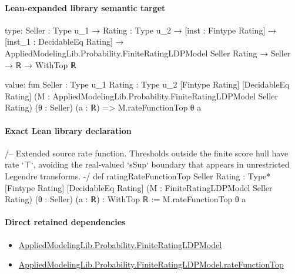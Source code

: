 \documentclass[10pt]{article}
\begin{document}
\paragraph{Lean-expanded library semantic target}
\begin{ReviewVerbatim}
type:
{Seller : Type u_1} →
  {Rating : Type u_2} →
    [inst : Fintype Rating] →
      [inst_1 : DecidableEq Rating] →
        AppliedModelingLib.Probability.FiniteRatingLDPModel Seller Rating → Seller → ℝ → WithTop ℝ

value:
fun {Seller : Type u_1} {Rating : Type u_2} [Fintype Rating] [DecidableEq Rating]
    (M : AppliedModelingLib.Probability.FiniteRatingLDPModel Seller Rating) (θ : Seller) (a : ℝ) =>
  M.rateFunctionTop θ a
\end{ReviewVerbatim}

\paragraph{Exact Lean library declaration}
\begin{ReviewVerbatim}
/--
Extended source rate function. Thresholds outside the finite score hull have
rate `⊤`, avoiding the real-valued `sSup` boundary that appears in unrestricted
Legendre transforms.
-/
def ratingRateFunctionTop {Seller Rating : Type*} [Fintype Rating]
    [DecidableEq Rating]
    (M : FiniteRatingLDPModel Seller Rating) (θ : Seller) (a : ℝ) :
    WithTop ℝ :=
  M.rateFunctionTop θ a
\end{ReviewVerbatim}

\paragraph{Direct retained dependencies}
\begin{itemize}\raggedright
\item \hyperlink{governing-declaration-765e92a42a7a9947}{Applied\allowbreak{}Modeling\allowbreak{}Lib.\allowbreak{}Probability.\allowbreak{}Finite\allowbreak{}Rating\allowbreak{}LDP\allowbreak{}Model}
\item \hyperlink{governing-declaration-34f68243ef859c07}{Applied\allowbreak{}Modeling\allowbreak{}Lib.\allowbreak{}Probability.\allowbreak{}Finite\allowbreak{}Rating\allowbreak{}LDP\allowbreak{}Model.\allowbreak{}rate\allowbreak{}Function\allowbreak{}Top}
\end{itemize}
\end{document}
